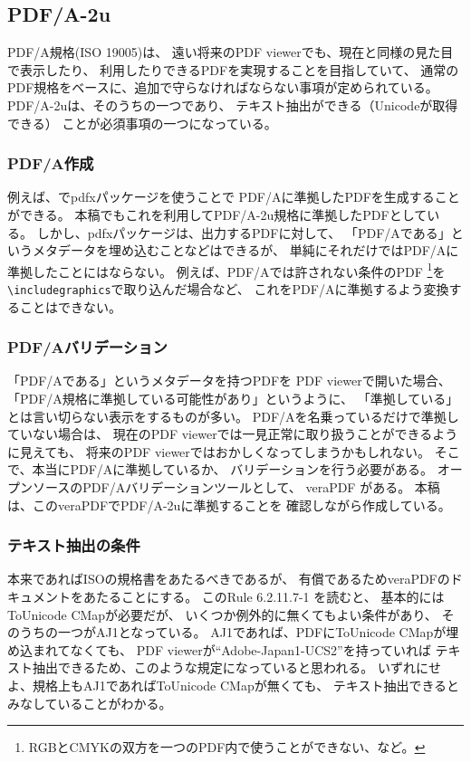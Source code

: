 \subsection{PDF/A-2u}

PDF/A規格(ISO 19005)は、
遠い将来のPDF viewerでも、現在と同様の見た目で表示したり、
利用したりできるPDFを実現することを目指していて、
通常のPDF規格をベースに、追加で守らなければならない事項が定められている。
PDF/A-2uは、そのうちの一つであり、
テキスト抽出ができる（Unicodeが取得できる）
ことが必須事項の一つになっている。

\subsubsection{PDF/A作成}

例えば、\LuaTeX でpdfxパッケージ\cite{pdfx}を使うことで
PDF/Aに準拠したPDFを生成することができる。
本稿でもこれを利用してPDF/A-2u規格に準拠したPDFとしている。
しかし、pdfxパッケージは、出力するPDFに対して、
「PDF/Aである」というメタデータを埋め込むことなどはできるが、
単純にそれだけではPDF/Aに準拠したことにはならない。
例えば、PDF/Aでは許されない条件のPDF
\footnote{RGBとCMYKの双方を一つのPDF内で使うことができない、など。}を
\texttt{\textbackslash includegraphics}で取り込んだ場合など、
これをPDF/Aに準拠するよう変換することはできない。

\subsubsection{PDF/Aバリデーション}

「PDF/Aである」というメタデータを持つPDFを
PDF viewerで開いた場合、
「PDF/A規格に準拠している可能性があり」というように、
「準拠している」とは言い切らない表示をするものが多い。
PDF/Aを名乗っているだけで準拠していない場合は、
現在のPDF viewerでは一見正常に取り扱うことができるように見えても、
将来のPDF viewerではおかしくなってしまうかもしれない。
そこで、本当にPDF/Aに準拠しているか、
バリデーションを行う必要がある。
オープンソースのPDF/Aバリデーションツールとして、
veraPDF \cite{verapdf}がある。
本稿は、このveraPDFでPDF/A-2uに準拠することを
確認しながら作成している。

\subsubsection{テキスト抽出の条件}

本来であればISOの規格書をあたるべきであるが、
有償であるためveraPDFのドキュメントをあたることにする。
このRule 6.2.11.7-1 \cite{verapdf-rule6.2.11.7-1}を読むと、
基本的にはToUnicode CMapが必要だが、
いくつか例外的に無くてもよい条件があり、
そのうちの一つがAJ1となっている。
AJ1であれば、PDFにToUnicode CMapが埋め込まれてなくても、
PDF viewerが``Adobe-Japan1-UCS2''を持っていれば
テキスト抽出できるため、このような規定になっていると思われる。
いずれにせよ、規格上もAJ1であればToUnicode CMapが無くても、
テキスト抽出できるとみなしていることがわかる。

